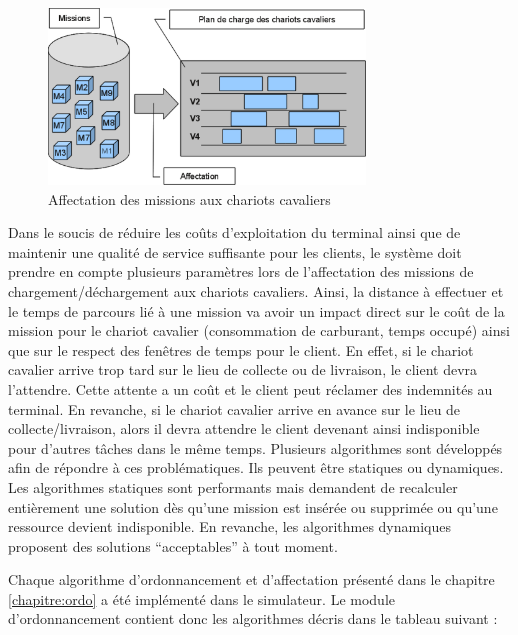 \begin{figure}[h]
\centering
\includegraphics[width=0.75\textwidth]{chapitres/simulation/ordonnancement.png}
\caption{Affectation des missions aux chariots cavaliers}
 \label{fig:simulation:ordonnancement}
\end{figure}

Dans le soucis de réduire les coûts d'exploitation du terminal ainsi que de maintenir une qualité de service suffisante pour les clients, le système doit prendre en compte plusieurs paramètres lors de l'affectation des missions de chargement/déchargement aux chariots cavaliers. Ainsi, la distance à effectuer et le temps de parcours lié à une mission va avoir un impact direct sur le coût de la mission pour le chariot cavalier (consommation de carburant, temps occupé) ainsi que sur le respect des fenêtres de temps pour le client. En effet, si le chariot cavalier arrive trop tard sur le lieu de collecte ou de livraison, le client devra l'attendre. Cette attente a un coût et le client peut réclamer des indemnités au terminal. En revanche, si le chariot cavalier arrive en avance sur le lieu de collecte/livraison, alors il devra attendre le client devenant ainsi indisponible pour d'autres tâches dans le même temps. Plusieurs algorithmes sont développés afin de répondre à ces problématiques. Ils peuvent être statiques ou dynamiques. Les algorithmes statiques sont performants mais demandent de recalculer entièrement une solution dès qu'une mission est insérée ou supprimée ou qu'une ressource devient indisponible. En revanche, les algorithmes dynamiques proposent des solutions ``acceptables'' à tout moment.

Chaque algorithme d'ordonnancement et d'affectation présenté dans le chapitre \ref{chapitre:ordo} a été implémenté dans le simulateur. Le module d'ordonnancement contient donc les algorithmes décris dans le tableau suivant : 

